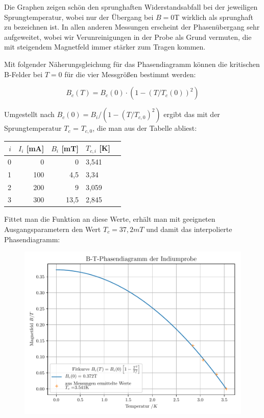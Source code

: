 Die Graphen zeigen schön den sprunghaften Widerstandsabfall bei der jeweiligen Sprungtemperatur, wobei nur der Übergang bei $B=0$T wirklich als sprunghaft zu bezeichnen ist. In allen anderen Messungen erscheint der Phasenübergang sehr aufgeweitet, wobei wir Verunreinigungen in der Probe als Grund vermuten, die mit steigendem Magnetfeld immer stärker zum Tragen kommen. 


Mit folgender Näherungsgleichung für das Phasendiagramm können die kritischen B-Felder bei $T=0$ für die vier Messgrößen bestimmt werden:

\begin{equation}
B_c(T) = B_c(0) \cdot \left( 1 - \left( T / T_c(0) \right)^2 \right)
\end{equation}

Umgestellt nach $B_c(0) = B_i / (1 - (T / T_{c,0})^2 )$ ergibt das mit der Sprungtemperatur $T_c$ = $T_{c,0}$, die man aus der Tabelle abliest:

\begin{table}[h]
\center\begin{tabular}[h]{|r|r|r|l|l|}
\hline
$i$ & $I_i$ [mA] &  $B_i$ [mT] & $T_{c,i}$ [K] \\
\hline
0 &   0 &       0 & 3,541 \\
1 & 100 &  4,5 & 3,34 \\
2 & 200 &  9 & 3,059 \\
3 & 300 & 13,5 & 2,845 \\
\hline
\end{tabular}
\end{table}

Fittet man die Funktion an diese Werte, erhält man mit geeigneten Ausgangsparametern den Wert $T_c = 37,2 mT$ und damit das interpolierte Phasendiagramm:

\begin{figure}[h]
\includegraphics[width=\textwidth]{B-T-Phasendiagramm_der_Indiumprobe.pdf}
\end{figure}

